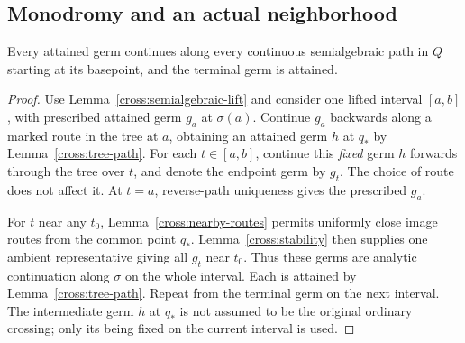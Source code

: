 \subsection{Monodromy and an actual neighborhood}

\begin{lemma}\label{cross:all-paths}
Every attained germ continues along every continuous semialgebraic path
in \(Q\) starting at its basepoint, and the terminal germ is attained.
\end{lemma}
\begin{proof}
Use Lemma~\ref{cross:semialgebraic-lift} and consider one lifted
interval \([a,b]\), with prescribed attained germ \(g_a\) at
\(\sigma(a)\). Continue \(g_a\) backwards along a marked route in the
tree at \(a\), obtaining an attained germ \(h\) at \(q_*\) by
Lemma~\ref{cross:tree-path}. For each \(t\in[a,b]\), continue this
\emph{fixed} germ \(h\) forwards through the tree over \(t\), and denote
the endpoint germ by \(g_t\). The choice of route does not affect it.
At \(t=a\), reverse-path uniqueness gives the prescribed \(g_a\).

For \(t\) near any \(t_0\), Lemma~\ref{cross:nearby-routes} permits
uniformly close image routes from the common point \(q_*\).
Lemma~\ref{cross:stability} then supplies one ambient representative
giving all \(g_t\) near \(t_0\). Thus these germs are analytic
continuation along \(\sigma\) on the whole interval. Each is attained
by Lemma~\ref{cross:tree-path}. Repeat from the terminal germ on the
next interval. The intermediate germ \(h\) at \(q_*\) is not assumed
to be the original ordinary crossing; only its being fixed on the
current interval is used.
\end{proof}

